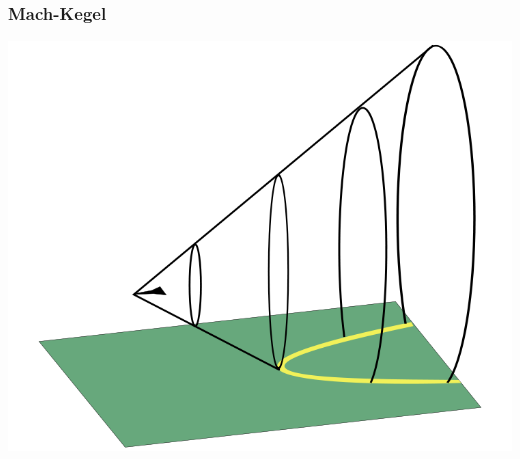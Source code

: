 \documentclass{beamer}
\begin{document}
\begin{frame}
\frametitle{Mach-Kegel}
\begin{center}
\includegraphics[width=0.8\hsize]{../../skript/graphics/shock.png}
\end{center}
\end{frame}
\end{document}
